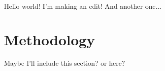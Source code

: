 \documentclass{article}
\begin{document}
Hello world! I'm making an edit! And another one...

\section{Methodology}

Maybe I'll include this section? or here?
\end{document}
